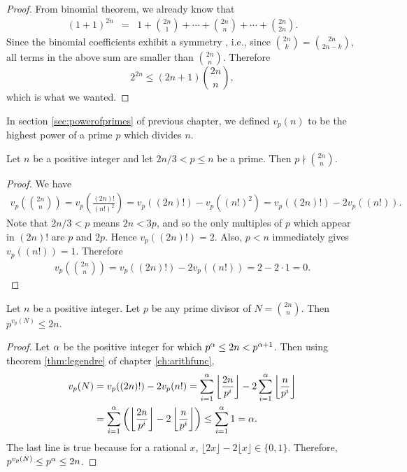 \documentclass{subfile}
\begin{document}
	\begin{proof}
		From binomial theorem, we already know that 
		\begin{eqnarray*}
			(1+1)^{2n}  & = & 1+\binom{2n}1+\cdots+\binom{2n}{n}+\cdots+\binom{2n}{2n}.
		\end{eqnarray*}
		Since the binomial coefficients exhibit a symmetry , i.e., since $\binom{2n}{k}=\binom{2n}{2n-k}$, all terms in the above sum are smaller than $\binom{2n}{n}$. Therefore
		\[2^{2n}\leq(2n+1)\binom{2n}n,\]
		which is what we wanted.
		
	\end{proof}
	In section \eqref{sec:powerofprimes} of previous chapter, we defined $v_p(n)$ to be the highest power of a prime $p$ which divides $n$. 
	\begin{lemma}\label{lem:bertrand2}
		Let $n$ be a positive integer and let $2n/3<p\leq n$ be a prime. Then $p \nmid \binom{2n}n$.
	\end{lemma}
	
	\begin{proof}
		We have
		\begin{align*}
			v_p \left(\binom{2n}n\right) =v_p \left(\frac{(2n)!}{(n!)^2}\right) = v_p((2n)!) - v_p((n!)^2) = v_p((2n)!) - 2v_p((n!)).
		\end{align*}
		Note that $2n/3<p$ means $2n<3p$, and so the only multiples of $p$ which appear in $(2n)!$ are $p$ and $2p$. Hence $v_p((2n)!) = 2$. Also, $p<n$ immediately gives $v_p((n!))=1$. Therefore
		\begin{align*}
			v_p \left(\binom{2n}n\right) = v_p((2n)!) - 2v_p((n!)) =  2 - 2 \cdot 1 = 0.
		\end{align*}
	\end{proof}
	
	\begin{lemma}\label{lem:bertrand3}
		Let $n$ be a positive integer. Let $p$ be any prime divisor of $N=\binom{2n}n$. Then $p^{v_p(N)}\leq2n$.
	\end{lemma}
	
	\begin{proof}
		Let $\alpha$ be the positive integer for which $p^\alpha \leq 2n<p^{\alpha +1}$. Then using theorem \eqref{thm:legendre} of chapter \eqref{ch:arithfunc},
		\begin{align*}
			v_p(N) & =  v_p((2n)!)-2v_p(n!)= \sum_{i=1}^{\alpha }\left\lfloor\dfrac{2n}{p^i}\right\rfloor-2\sum_{i=1}^{\alpha }\left\lfloor\dfrac{n}{p^i}\right\rfloor\\
			& =  \sum_{i=1}^{\alpha }\left(\left\lfloor\dfrac{2n}{p^i}\right\rfloor-2\left\lfloor\dfrac{n}{p^i}\right\rfloor\right) \leq \sum_{i=1}^{\alpha }1 =\alpha.
		\end{align*}
		The last line is true because for a rational $x$, $\lfloor2x\rfloor-2\lfloor x\rfloor\in\{0,1\}$. Therefore, $p^{v_p(N)} \leq p^{\alpha} \leq 2n$.
	\end{proof}
	
\end{document}
